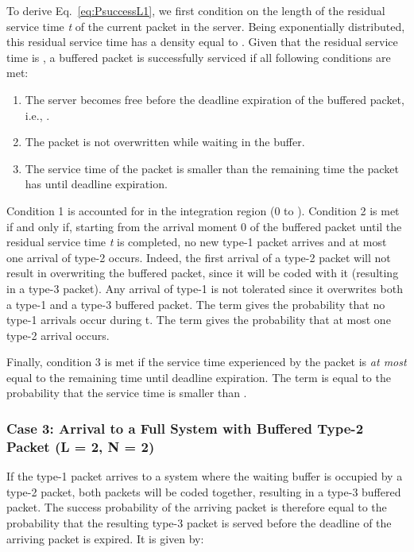 \documentclass[preprint,12pt]{elsarticle}
\theoremstyle{definition}
\theoremstyle{plain}
\theoremstyle{remark}
\begin{document}
To derive Eq.~\eqref{eq:PsuccessL1}, we first condition on the length of the residual service time \textit{t} of the current packet in the server. Being exponentially distributed, this residual service time has a density equal to . Given that the residual service time is , a buffered packet is successfully serviced if all following conditions are met:
\begin{enumerate}
	\item The server becomes free before the deadline expiration of the buffered packet, i.e., .
	\item The packet is not overwritten while waiting in the buffer.
	\item The service time of the packet is smaller than the remaining time the packet has until deadline expiration.
\end{enumerate}

Condition 1 is accounted for in the integration region (0 to ). Condition 2 is met if and only if, starting from the arrival moment 0 of the buffered packet until the residual service time \textit{t} is completed, no new type-1 packet arrives and at most one arrival of type-2 occurs. Indeed, the first arrival of a type-2 packet will not result in overwriting the buffered packet, since it will be coded with it (resulting in a type-3 packet). Any arrival of type-1 is not tolerated since it overwrites both a type-1 and a type-3 buffered packet. The term  gives the probability that no type-1 arrivals occur during t. The term  gives the probability that at most one type-2 arrival occurs.

Finally, condition 3 is met if the service time experienced by the packet is \textit{at most} equal to the remaining time  until deadline expiration. The term  is equal to the probability that the service time is smaller than .

\smallskip

\subsubsection{Case 3: Arrival to a Full System with Buffered Type-2 Packet (L = 2, N = 2)}

If the type-1 packet arrives to a system where the waiting buffer is occupied by a type-2 packet, both packets will be coded together, resulting in a type-3 buffered packet. The success probability of the arriving packet is therefore equal to the probability that the resulting type-3 packet is served before the deadline  of the arriving packet is expired. It is given by:
\end{document}
